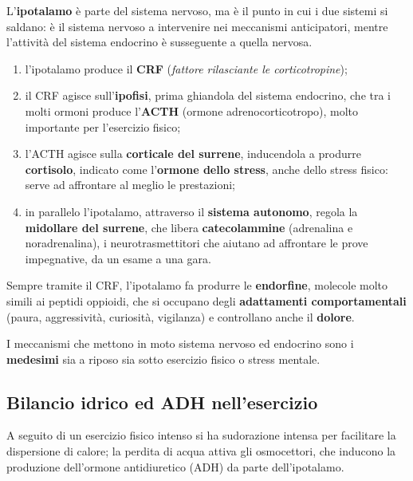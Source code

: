 L'\textbf{ipotalamo} è parte del sistema nervoso, ma è il punto in cui i due sistemi si saldano: è
il sistema nervoso a intervenire nei meccanismi anticipatori, mentre l'attività del sistema
endocrino è susseguente a quella nervosa.

\begin{enumerate}
  \item l'ipotalamo produce il \textbf{CRF} (\textit{fattore rilasciante le corticotropine});
  \item il CRF agisce sull'\textbf{ipofisi}, prima ghiandola del sistema endocrino, che tra i molti
    ormoni produce l'\textbf{ACTH} (ormone adrenocorticotropo), molto importante per l'esercizio
    fisico;
  \item l'ACTH agisce sulla \textbf{corticale del surrene}, inducendola a produrre
    \textbf{cortisolo}, indicato come l'\textbf{ormone dello stress}, anche dello stress fisico:
    serve ad affrontare al meglio le prestazioni;
  \item in parallelo l'ipotalamo, attraverso il \textbf{sistema autonomo}, regola la
    \textbf{midollare del surrene}, che libera \textbf{catecolammine} (adrenalina e noradrenalina),
    i neurotrasmettitori che aiutano ad affrontare le prove impegnative, da un esame a una gara.
\end{enumerate}

Sempre tramite il CRF, l'ipotalamo fa produrre le \textbf{endorfine}, molecole molto simili ai
peptidi oppioidi, che si occupano degli \textbf{adattamenti comportamentali} (paura, aggressività,
curiosità, vigilanza) e controllano anche il \textbf{dolore}.

I meccanismi che mettono in moto sistema nervoso ed endocrino sono i \textbf{medesimi} sia a riposo
sia sotto esercizio fisico o stress mentale.

\subsection{Bilancio idrico ed ADH nell'esercizio}

A seguito di un esercizio fisico intenso si ha sudorazione intensa per facilitare la dispersione di
calore; la perdita di acqua attiva gli osmocettori, che inducono la produzione dell'ormone
antidiuretico (ADH) da parte dell'ipotalamo.

